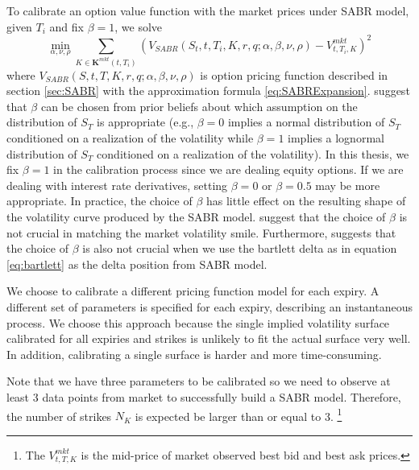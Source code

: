 \documentclass[letterpaper,12pt,titlepage,oneside,final]{book}
\numberwithin{equation}{section}
\theoremstyle{definition}
\newcommand{\Vmkt}{V^{mkt}}
\begin{document}
To calibrate an option value function with the market prices under SABR model, given $T_i$  and fix $\beta=1$, we solve
\[
\min_{\alpha,\nu,\rho} \sum_{K \in \mathbf{K}^{mkt}(t,T_i) }^{} \left(V_{SABR}(S_t,t,T_i,K,r,q;\alpha,\beta,\nu,\rho)-\Vmkt_{t,T_i,K}\right)^2
\]
where $V_{SABR}(S,t,T,K,r,q;\alpha,\beta,\nu,\rho)$ is option pricing function described in section \ref{sec:SABR} with the approximation formula \eqref{eq:SABRExpansion}.  \citet{hagan2002managing} suggest that $\beta$ can be chosen from prior beliefs about which assumption on the distribution of $S_T$  is appropriate (e.g., $\beta=0$ implies a normal distribution of $S_T$ conditioned on a realization of the volatility while $\beta=1$ implies a lognormal distribution of $S_T$ conditioned on a realization of the volatility).   In this thesis, we fix $\beta=1$ in the calibration process since we are dealing equity options. If we are dealing with interest rate derivatives, setting $\beta=0$ or $\beta=0.5$ may be more appropriate. In practice, the choice of $\beta$ has little effect on the resulting shape of the volatility curve produced by the SABR model. \citet{hagan2002managing} suggest that the choice of $\beta$ is not crucial in matching the market volatility smile. Furthermore, \citet{bartlett2006hedging}  suggests that the choice of $\beta$ is also not crucial when we use the bartlett delta as in equation \eqref{eq:bartlett} as the delta position from SABR model.

We choose to calibrate a different pricing function model for each expiry. A different set of parameters is specified for each expiry, describing an instantaneous process.  We choose this approach because the single implied volatility surface calibrated for all expiries and strikes is unlikely to fit the actual surface very well. In addition,  calibrating a single surface is harder and more time-consuming. 

Note that we have three parameters to be calibrated so we need to observe at least 3 data points from market to successfully build a SABR model. Therefore, the number of strikes $N_K$ is expected be larger than or equal to 3. \footnote{The $\Vmkt_{t,T,K}$ is the mid-price of market observed best bid and  best ask prices.}
\end{document}
